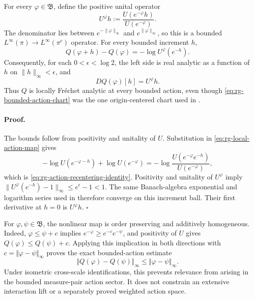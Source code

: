 For every \(\varphi\in\mathfrak B\), define the positive unital operator
\begin{equation}
 U^\varphi h
 :=\frac{U(e^{-\varphi}h)}{U(e^{-\varphi})}.
 \label{eq:rg-action-recentered-operator}
\end{equation}
The denominator lies between
\(e^{-\lVert\varphi\rVert_\infty}\) and
\(e^{\lVert\varphi\rVert_\infty}\), so this is a bounded
\(L^\infty(\pi)\to L^\infty(\pi^c)\) operator.  For every bounded increment
\(h\),
\begin{equation}
 Q(\varphi+h)-Q(\varphi)
 =-\log U^\varphi(e^{-h}).
 \label{eq:rg-action-recentering-identity}
\end{equation}
Consequently, for each \(0<\epsilon<\log2\), the left side is real analytic
as a function of \(h\) on
\(\lVert h\rVert_\infty<\epsilon\), and
\begin{equation}
 DQ(\varphi)[h]=U^\varphi h.
 \label{eq:rg-action-everywhere-bounded-derivative}
\end{equation}
Thus \(Q\) is locally Fr\'echet analytic at every bounded action, even though
\eqref{eq:rg-bounded-action-chart} was the one origin-centered chart used in
. 

\paragraph{Proof.}
The bounds follow from positivity and unitality of \(U\).  Substitution in
\eqref{eq:rg-local-action-map} gives
\[
 -\log U(e^{-\varphi-h})+\log U(e^{-\varphi})
 =-\log\frac{U(e^{-\varphi}e^{-h})}{U(e^{-\varphi})},
\]
which is \eqref{eq:rg-action-recentering-identity}.  Positivity and
unitality of \(U^\varphi\) imply
\(\lVert U^\varphi(e^{-h})-1\rVert_\infty
\leq e^\epsilon-1<1\).  The same Banach-algebra exponential and logarithm
series used in  therefore converge on
this increment ball.  Their first derivative at \(h=0\) is
\(U^\varphi h\). \(\square\)

For \(\varphi,\psi\in\mathfrak B\), the nonlinear map is order preserving
and additively homogeneous.  Indeed,
\(\varphi\leq\psi+c\) implies
\(e^{-\varphi}\geq e^{-c}e^{-\psi}\), and positivity of \(U\) gives
\(Q(\varphi)\leq Q(\psi)+c\).  Applying this implication in both
directions with \(c=\Vert\varphi-\psi\Vert_\infty\) proves the exact
bounded-action estimate
\begin{equation}
\Vert Q(\varphi)-Q(\psi)\Vert_\infty
\leq\Vert\varphi-\psi\Vert_\infty.
\label{eq:rg-nonlinear-action-sup-contraction}
\end{equation}
Under isometric cross-scale identifications, this prevents relevance from
arising in the bounded measure-pair action sector.  It does not constrain an
extensive interaction lift or a separately proved weighted action space.

